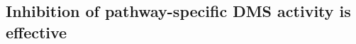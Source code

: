 \subsection{Inhibition of pathway-specific DMS activity is effective}
\label{sec:glmhmm:inhibition_of_pathway}